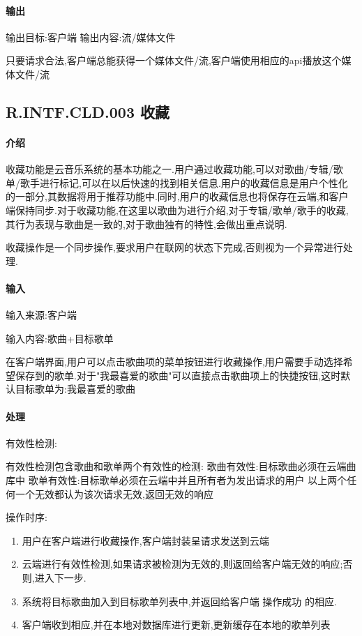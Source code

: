 \paragraph{输出}

输出目标:客户端
输出内容:流/媒体文件

只要请求合法,客户端总能获得一个媒体文件/流,客户端使用相应的api播放这个媒体文件/流


\subsection{R.INTF.CLD.003 收藏}

\paragraph{介绍}

收藏功能是云音乐系统的基本功能之一.用户通过收藏功能,可以对歌曲/专辑/歌单/歌手进行标记,可以在以后快速的找到相关信息.用户的收藏信息是用户个性化的一部分,其数据将用于推荐功能中.同时,用户的收藏信息也将保存在云端,和客户端保持同步.对于收藏功能,在这里以歌曲为进行介绍,对于专辑/歌单/歌手的收藏,其行为表现与歌曲是一致的,对于歌曲独有的特性,会做出重点说明.

收藏操作是一个同步操作,要求用户在联网的状态下完成,否则视为一个异常进行处理.

\paragraph{输入}

输入来源:客户端

输入内容:歌曲+目标歌单

在客户端界面,用户可以点击歌曲项的菜单按钮进行收藏操作,用户需要手动选择希望保存到的歌单.对于"我最喜爱的歌曲"可以直接点击歌曲项上的快捷按钮,这时默认目标歌单为:我最喜爱的歌曲

\paragraph{处理}

有效性检测:

有效性检测包含歌曲和歌单两个有效性的检测:
歌曲有效性:目标歌曲必须在云端曲库中
歌单有效性:目标歌单必须在云端中并且所有者为发出请求的用户
以上两个任何一个无效都认为该次请求无效,返回无效的响应

操作时序:
\begin{enumerate}
	\item 用户在客户端进行收藏操作,客户端封装呈请求发送到云端
	\item 云端进行有效性检测,如果请求被检测为无效的,则返回给客户端无效的响应;否则,进入下一步.
	\item 系统将目标歌曲加入到目标歌单列表中,并返回给客户端 操作成功 的相应.
	\item 客户端收到相应,并在本地对数据库进行更新,更新缓存在本地的歌单列表
\end{enumerate}


